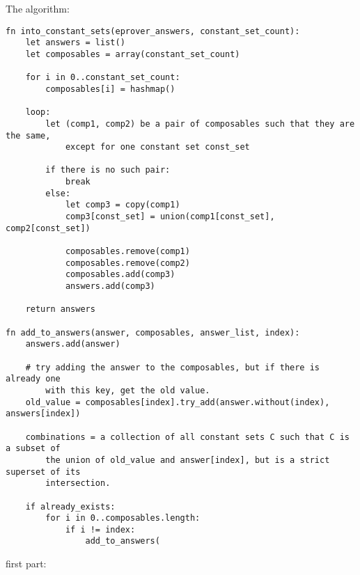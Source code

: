 \documentclass{article}
\begin{document}
The algorithm:
\begin{verbatim}
fn into_constant_sets(eprover_answers, constant_set_count):
    let answers = list()
    let composables = array(constant_set_count)

    for i in 0..constant_set_count:
        composables[i] = hashmap()

    loop:
        let (comp1, comp2) be a pair of composables such that they are the same,
            except for one constant set const_set
            
        if there is no such pair:
            break
        else:
            let comp3 = copy(comp1)
            comp3[const_set] = union(comp1[const_set], comp2[const_set])

            composables.remove(comp1)
            composables.remove(comp2)
            composables.add(comp3)
            answers.add(comp3)
    
    return answers

fn add_to_answers(answer, composables, answer_list, index):
    answers.add(answer)
    
    # try adding the answer to the composables, but if there is already one
        with this key, get the old value.
    old_value = composables[index].try_add(answer.without(index), answers[index])

    combinations = a collection of all constant sets C such that C is a subset of
        the union of old_value and answer[index], but is a strict superset of its
        intersection.

    if already_exists:
        for i in 0..composables.length:
            if i != index:
                add_to_answers(

\end{verbatim}

first part:
\begin{verbatim}

\end{verbatim}
\end{document}
